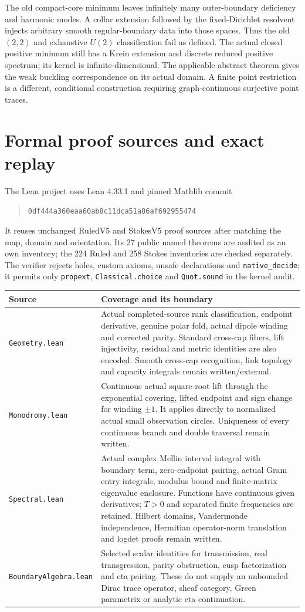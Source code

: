 \documentclass[11pt]{article}
\begin{document}
The old compact-core minimum leaves infinitely many outer-boundary deficiency
and harmonic modes. A collar extension followed by the fixed-Dirichlet
resolvent injects arbitrary smooth regular-boundary data into those spaces.
Thus the old $(2,2)$ and exhaustive $U(2)$ classification fail as defined.
The actual closed positive minimum still has a Krein extension and discrete
reduced positive spectrum; its kernel is infinite-dimensional. The applicable
abstract theorem gives the weak buckling correspondence on its actual domain.
A finite point restriction is a different, conditional construction requiring
graph-continuous surjective point traces.

\newpage
\section{Formal proof sources and exact replay}
The Lean project uses Lean 4.33.1 and pinned Mathlib commit
\begin{quote}\small
\nolinkurl{0df444a360eaa60ab8c11dca51a86af692955474}
\end{quote}
It reuses unchanged RuledV5 and StokesV5 proof sources after matching the map,
domain and orientation. Its 27 public named theorems are audited as an own
inventory; the 224 Ruled and 258 Stokes inventories are checked separately.
The verifier rejects holes, custom axioms, unsafe declarations and
\texttt{native\_decide}; it permits only \texttt{propext},
\texttt{Classical.choice} and \texttt{Quot.sound} in the kernel audit.

\begin{longtable}{@{}p{.27\linewidth}p{.66\linewidth}@{}}
\toprule Source & Coverage and its boundary\\\midrule\endhead
\texttt{Geometry.lean} & Actual completed-source rank classification,
endpoint derivative, genuine polar fold, actual dipole winding and corrected
parity. Standard cross-cap fibers, lift injectivity, residual and metric
identities are also encoded. Smooth cross-cap recognition, link topology and
capacity integrals remain written/external.\\[4pt]
\texttt{Monodromy.lean} & Continuous actual square-root lift through the
exponential covering, lifted endpoint and sign change for winding $\pm1$.
It applies directly to normalized actual small observation circles.
Uniqueness of every continuous branch and double traversal remain written.\\[4pt]
\texttt{Spectral.lean} & Actual complex Mellin interval integral with boundary
term, zero-endpoint pairing, actual Gram entry integrals, modulus bound and
finite-matrix eigenvalue enclosure. Functions have continuous given derivatives;
$T>0$ and separated finite frequencies are retained. Hilbert domains,
Vandermonde independence, Hermitian operator-norm translation and logdet
proofs remain written.\\[4pt]
\texttt{BoundaryAlgebra.lean} & Selected scalar identities for transmission,
real transgression, parity obstruction, cusp factorization and eta pairing.
These do not supply an unbounded Dirac trace operator, sheaf category,
Green parametrix or analytic eta continuation.\\\bottomrule
\end{longtable}
\end{document}
